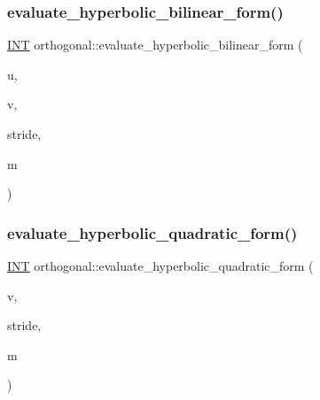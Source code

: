 \subsubsection{\texorpdfstring{evaluate\+\_\+hyperbolic\+\_\+bilinear\+\_\+form()}{evaluate\_hyperbolic\_bilinear\_form()}}
{\footnotesize\ttfamily \mbox{\hyperlink{galois_8h_a09fddde158a3a20bd2dcadb609de11dc}{I\+NT}} orthogonal\+::evaluate\+\_\+hyperbolic\+\_\+bilinear\+\_\+form (\begin{DoxyParamCaption}\item[{\mbox{\hyperlink{galois_8h_a09fddde158a3a20bd2dcadb609de11dc}{I\+NT}} $\ast$}]{u,  }\item[{\mbox{\hyperlink{galois_8h_a09fddde158a3a20bd2dcadb609de11dc}{I\+NT}} $\ast$}]{v,  }\item[{\mbox{\hyperlink{galois_8h_a09fddde158a3a20bd2dcadb609de11dc}{I\+NT}}}]{stride,  }\item[{\mbox{\hyperlink{galois_8h_a09fddde158a3a20bd2dcadb609de11dc}{I\+NT}}}]{m }\end{DoxyParamCaption})}

\mbox{\label{classorthogonal_a4c5c5908326e2f17d3addecbe2ba9d18}} 
\subsubsection{\texorpdfstring{evaluate\+\_\+hyperbolic\+\_\+quadratic\+\_\+form()}{evaluate\_hyperbolic\_quadratic\_form()}}
{\footnotesize\ttfamily \mbox{\hyperlink{galois_8h_a09fddde158a3a20bd2dcadb609de11dc}{I\+NT}} orthogonal\+::evaluate\+\_\+hyperbolic\+\_\+quadratic\+\_\+form (\begin{DoxyParamCaption}\item[{\mbox{\hyperlink{galois_8h_a09fddde158a3a20bd2dcadb609de11dc}{I\+NT}} $\ast$}]{v,  }\item[{\mbox{\hyperlink{galois_8h_a09fddde158a3a20bd2dcadb609de11dc}{I\+NT}}}]{stride,  }\item[{\mbox{\hyperlink{galois_8h_a09fddde158a3a20bd2dcadb609de11dc}{I\+NT}}}]{m }\end{DoxyParamCaption})}

\mbox{\label{classorthogonal_a8ee79da4c853cd384a0028cbebbbe0ee}} 
